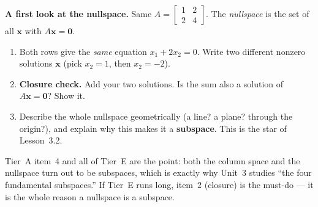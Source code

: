 \documentclass[10pt]{article}
\newcommand{\zero}{\mathbf{0}}
\begin{document}
\begin{tcolorbox}[colback=white, colframe=black!40, title=\textbf{Tier E --- Extension},
    fonttitle=\bfseries, arc=1.5mm, left=3mm, right=3mm, top=2mm, bottom=2mm, breakable]
\textbf{A first look at the nullspace.} Same $A=\begin{bmatrix} 1 & 2 \\ 2 & 4 \end{bmatrix}$. The
\emph{nullspace} is the set of all $\mathbf x$ with $A\mathbf x=\zero$.
\begin{enumerate}[leftmargin=1.7em, itemsep=9pt]
  \item Both rows give the \emph{same} equation $x_1+2x_2=0$. Write two different nonzero
        solutions $\mathbf x$ (pick $x_2=1$, then $x_2=-2$). 
  \item \textbf{Closure check.} Add your two solutions. Is the sum also a solution of
        $A\mathbf x=\zero$? Show it. 
  \item Describe the whole nullspace geometrically (a line? a plane? through the origin?), and
        explain why this makes it a \textbf{subspace}. This is the star of Lesson~3.2. 
\end{enumerate}
\end{tcolorbox}

\begin{teachernote}
Tier~A item~4 and all of Tier~E are the point: both the column space and the nullspace turn out to
be subspaces, which is exactly why Unit~3 studies ``the four fundamental subspaces.'' If Tier~E
runs long, item~2 (closure) is the must-do --- it is the whole reason a nullspace is a subspace.
\end{teachernote}
\end{document}
